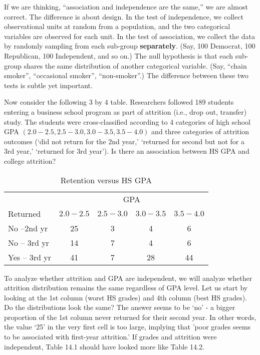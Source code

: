 \documentclass[11pt]{book}\usepackage[]{graphicx}\usepackage[]{color}
\begin{document}
If we are thinking, ``association and independence are the same,''  we are almost correct.  The difference is about design. In the test of independence, we collect observational units at random from a population, and the two categorical variables are observed for each unit. In the test of association, we collect the data by randomly sampling from each sub-group \textbf{separately}. (Say, 100 Democrat, 100 Republican, 100 Independent, and so on.) The null hypothesis is that each sub-group shares the same distribution of another categorical variable. (Say, ``chain smoker'', ``occasional smoker'', ``non-smoker''.)  The difference between these two tests is subtle yet important.

Now consider the following 3 by 4 table.  Researchers followed 189 students entering a business school program as part of attrition (i.e., drop out, transfer) study.  The students were cross-classified according to 4 categories of high school GPA $(2.0-2.5, 2.5-3.0, 3.0-3.5, 3.5-4.0)$ and three categories of attrition outcomes (`did not return for the 2nd year,' `returned for second but not for a 3rd year,' `returned for 3rd year').  Is there an association between HS GPA and college attrition?

\begin{table}[ht]
\centering
\caption{Retention versus HS GPA}
\begin{tabular}{@{} lcccc @{}} \hline
& \multicolumn{4}{c}{GPA} \\
Returned & $2.0-2.5$ & $2.5-3.0$ & $3.0-3.5$ & $3.5-4.0$ \\ \hline
No --2nd yr & 25 & 3 & 4 & 6 \\
No -- 3rd yr & 14 & 7 & 4 & 6 \\
Yes -- 3rd yr & 41 & 7 & 28 & 44 \\ \hline
\end{tabular}
\end{table}

To analyze whether attrition and GPA are independent, we will analyze whether attrition distribution remains the same regardless of GPA level.  Let us start by looking at the 1st column (worst HS grades) and 4th column (best HS grades).  Do the distributions look the same?   The answer seems to be `no' - a bigger proportion of the 1st column never returned for their second year.  In other words, the value `25' in the very first cell is too large, implying that 'poor grades seems to be associated with first-year attrition.'  If grades and attrition were independent, Table 14.1 should have looked more like Table 14.2.
\end{document}
